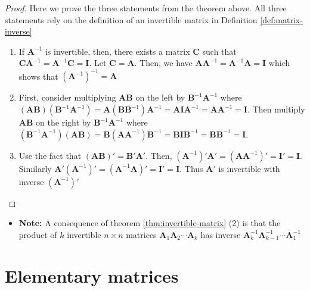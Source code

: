 \documentclass[
]{book}
\providecommand{\tightlist}{%
  \setlength{\itemsep}{0pt}\setlength{\parskip}{0pt}}
\theoremstyle{definition}
\theoremstyle{definition}
\theoremstyle{definition}
\theoremstyle{definition}
\theoremstyle{remark}
\begin{document}
\begin{proof}

Here we prove the three statements from the theorem above. All three statements rely on the definition of an invertible matrix in Definition \ref{def:matrix-inverse}

\begin{enumerate}
\def\labelenumi{\arabic{enumi})}
\item
  If \(\mathbf{A}^{-1}\) is invertible, then, there exists a matrix \(\mathbf{C}\) such that \(\mathbf{C} \mathbf{A}^{-1} = \mathbf{A}^{-1} \mathbf{C} = \mathbf{I}\). Let \(\mathbf{C} = \mathbf{A}\). Then, we have \(\mathbf{A} \mathbf{A}^{-1} = \mathbf{A}^{-1} \mathbf{A} = \mathbf{I}\) which shows that \(\left(\mathbf{A}^{-1}\right)^{-1} = \mathbf{A}\)
\item
  First, consider multiplying \(\mathbf{A}\mathbf{B}\) on the left by \(\mathbf{B}^{-1} \mathbf{A}^{-1}\) where \((\mathbf{A}\mathbf{B}) (\mathbf{B}^{-1} \mathbf{A}^{-1}) = \mathbf{A} (\mathbf{B} \mathbf{B}^{-1}) \mathbf{A}^{-1} = \mathbf{A} \mathbf{I} \mathbf{A}^{-1} = \mathbf{A} \mathbf{A}^{-1} = \mathbf{I}\). Then multiply \(\mathbf{A}\mathbf{B}\) on the right by \(\mathbf{B}^{-1} \mathbf{A}^{-1}\) where \((\mathbf{B}^{-1} \mathbf{A}^{-1}) (\mathbf{A}\mathbf{B}) = \mathbf{B} (\mathbf{A} \mathbf{A}^{-1}) \mathbf{B}^{-1} = \mathbf{B} \mathbf{I} \mathbf{B}^{-1} = \mathbf{B} \mathbf{B}^{-1} = \mathbf{I}\).
\item
  Use the fact that \((\mathbf{A} \mathbf{B})' = \mathbf{B}' \mathbf{A}'\). Then, \((\mathbf{A}^{-1})' \mathbf{A}' = (\mathbf{A}\mathbf{A}^{-1})' = \mathbf{I}' = \mathbf{I}\). Similarly \(\mathbf{A}'(\mathbf{A}^{-1})' = (\mathbf{A}^{-1}\mathbf{A})' = \mathbf{I}' = \mathbf{I}\). Thus \(\mathbf{A}'\) is invertible with inverse \((\mathbf{A}^{-1})'\)
\end{enumerate}

\end{proof}

\begin{itemize}
\tightlist
\item
  \textbf{Note:} A consequence of theorem \ref{thm:invertible-matrix} (2) is that the product of \(k\) invertible \(n \times n\) matrices \(\mathbf{A}_1 \mathbf{A}_2 \cdots \mathbf{A}_k\) has inverse \(\mathbf{A}_k^{-1} \mathbf{A}_{k-1}^{-1} \cdots \mathbf{A}_1^{-1}\)
\end{itemize}

\hypertarget{elementary-matrices}{%
\section{Elementary matrices}\label{elementary-matrices}}
\end{document}
